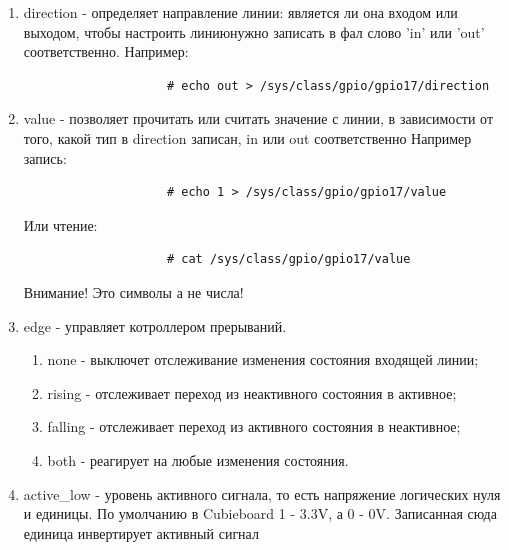 \documentclass[a4paper,12pt]{report} %
\begin{document}
			\begin{enumerate}
			  \item{direction - определяет направление линии: является ли она входом или
			  выходом, чтобы настроить линиюнужно записать в фал слово 'in' или 'out'
			  соответственно. Например:
				  \begin{verbatim} 
				  	# echo out > /sys/class/gpio/gpio17/direction
				  \end{verbatim}}
			  \item{value - позволяет прочитать или считать значение с линии, в зависимости
			  от того, какой тип в direction записан, in или out соответственно Например
			  запись: 
				  \begin{verbatim} 
				  	# echo 1 > /sys/class/gpio/gpio17/value
				  \end{verbatim} 
				  Или чтение: 
				\begin{verbatim} 
					# cat /sys/class/gpio/gpio17/value
				\end{verbatim} 
				Внимание! Это символы а не числа!}
			  \item{edge - управляет котроллером прерываний. 
			  	\begin{enumerate}
				  \item{none - выключет отслеживание изменения состояния входящей линии;}
				  \item{rising - отслеживает переход из неактивного состояния в активное;}
				  \item{falling - отслеживает переход из активного состояния в неактивное;}
				  \item{both - реагирует на любые изменения состояния.}
				\end{enumerate}}
			  \item{active\_low - уровень активного сигнала, то есть напряжение логических
			  нуля и единицы. По умолчанию в Cubieboard 1 - 3.3V, а 0 - 0V. Записанная сюда
			  единица инвертирует активный сигнал}
			\end{enumerate}
\end{document}
